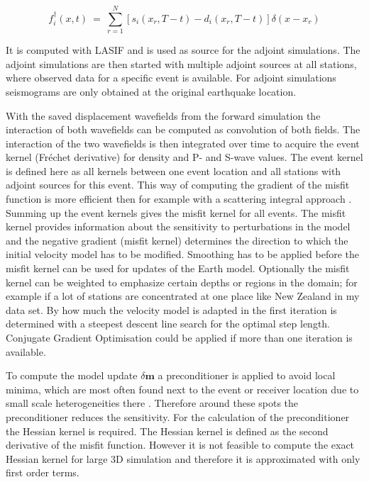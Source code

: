 \begin{equation}
f_i^{\dagger}(x,t) \ = \ \sum_{r=1}^N [ s_i(x_r, T-t) - d_i(x_r, T-t) ] \delta (x-x_r)
\end{equation}

It is computed with LASIF and is used as source for the adjoint simulations.
The adjoint simulations are then started with multiple adjoint sources at all stations, where observed data for a 
specific event is available. 
For adjoint simulations seismograms are only obtained at the original earthquake location.

%
%
With the saved displacement wavefields from the forward simulation the interaction of both wavefields can be computed as
convolution of both fields. 
The interaction of the two wavefields is then integrated over time to acquire the event kernel (Fr\'{e}chet derivative)
for density and P- and S-wave values. 
The event kernel is defined here as all kernels between one event location and all stations with adjoint sources for 
this event.
This way of computing the gradient of the misfit function is more efficient then for example with a scattering integral
approach \citep{Fichtner2006a}.
%
Summing up the event kernels gives the misfit kernel for all events.
The misfit kernel provides information about the sensitivity to perturbations in the model \citep{Magnoni2012}
and the negative gradient (misfit kernel) determines the direction to which the initial velocity model has to be modified. 
Smoothing has to be applied before the misfit kernel can be used for updates of the Earth model.
Optionally the misfit kernel can be weighted to emphasize certain depths or regions in the domain;
for example if a lot of stations are concentrated at one place like New Zealand in my data set.
By how much the velocity model is adapted in the first iteration is determined with a steepest descent line
search for the optimal step length.
Conjugate Gradient Optimisation could be applied if more than one iteration is available.

To compute the model update $\delta \boldsymbol{m}$ a preconditioner is applied to avoid local minima, which are most
often found next to the event or receiver location due to small scale heterogeneities there \citep{Fichtner2009}.
Therefore around these spots the preconditioner reduces the sensitivity.
For the calculation of the preconditioner the Hessian kernel is required. 
The Hessian kernel is defined as the second derivative of the misfit function. 
However it is not feasible to compute the exact Hessian kernel for large 3D simulation and therefore
it is approximated with only first order terms.

